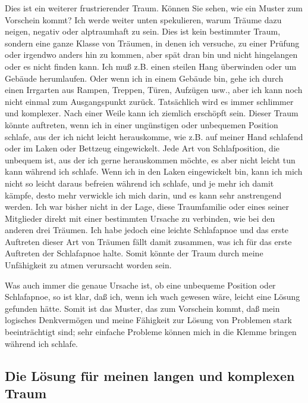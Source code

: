 Dies ist ein weiterer frustrierender Traum.
Können Sie sehen, wie ein Muster zum Vorschein kommt?
Ich werde weiter unten spekulieren, warum Träume dazu neigen, negativ oder alptraumhaft zu sein.
Dies ist kein bestimmter Traum, sondern eine ganze Klasse von Träumen, in denen ich versuche, zu einer Prüfung oder irgendwo anders hin zu kommen, aber spät dran bin und nicht hingelangen oder es nicht finden kann.
Ich muß z.B. einen steilen Hang überwinden oder um Gebäude herumlaufen.
Oder wenn ich in einem Gebäude bin, gehe ich durch einen Irrgarten aus Rampen, Treppen, Türen, Aufzügen usw., aber ich kann noch nicht einmal zum Ausgangspunkt zurück.
Tatsächlich wird es immer schlimmer und komplexer.
Nach einer Weile kann ich ziemlich erschöpft sein.
Dieser Traum könnte auftreten, wenn ich in einer ungünstigen oder unbequemen Position schlafe, aus der ich nicht leicht herauskomme, wie z.B. auf meiner Hand schlafend oder im Laken oder Bettzeug eingewickelt.
Jede Art von Schlafposition, die unbequem ist, aus der ich gerne herauskommen möchte, es aber nicht leicht tun kann während ich schlafe.
Wenn ich in den Laken eingewickelt bin, kann ich mich nicht so leicht daraus befreien während ich schlafe, und je mehr ich damit kämpfe, desto mehr verwickle ich mich darin, und es kann sehr anstrengend werden.
Ich war bisher nicht in der Lage, diese Traumfamilie oder eines seiner Mitglieder direkt mit einer bestimmten Ursache zu verbinden, wie bei den anderen drei Träumen.
Ich habe jedoch eine leichte Schlafapnoe und das erste Auftreten dieser Art von Träumen fällt damit zusammen, was ich für das erste Auftreten der Schlafapnoe halte.
Somit könnte der Traum durch meine Unfähigkeit zu atmen verursacht worden sein.

Was auch immer die genaue Ursache ist, ob eine unbequeme Position oder Schlafapnoe, so ist klar, daß ich, wenn ich wach gewesen wäre, leicht eine Lösung gefunden hätte.
Somit ist das Muster, das zum Vorschein kommt, daß mein logisches Denkvermögen und meine Fähigkeit zur Lösung von Problemen stark beeinträchtigt sind; sehr einfache Probleme können mich in die Klemme bringen während ich schlafe.
 

\subsection{Die Lösung für meinen langen und komplexen Traum}\hypertarget{c3_5e}{}

